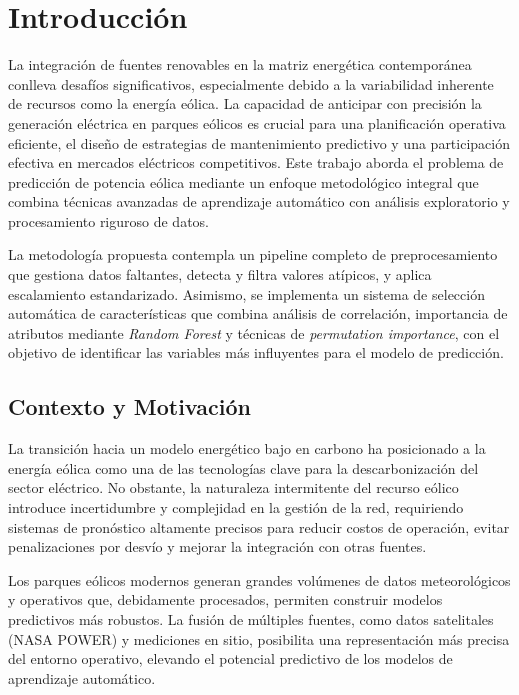 \documentclass[conference]{IEEEtran}
\begin{document}
	
\section{Introducción}
	
La integración de fuentes renovables en la matriz energética contemporánea conlleva desafíos significativos, especialmente debido a la variabilidad inherente de recursos como la energía eólica. La capacidad de anticipar con precisión la generación eléctrica en parques eólicos es crucial para una planificación operativa eficiente, el diseño de estrategias de mantenimiento predictivo y una participación efectiva en mercados eléctricos competitivos. Este trabajo aborda el problema de predicción de potencia eólica mediante un enfoque metodológico integral que combina técnicas avanzadas de aprendizaje automático con análisis exploratorio y procesamiento riguroso de datos.
	
La metodología propuesta contempla un pipeline completo de preprocesamiento que gestiona datos faltantes, detecta y filtra valores atípicos, y aplica escalamiento estandarizado. Asimismo, se implementa un sistema de selección automática de características que combina análisis de correlación, importancia de atributos mediante \textit{Random Forest} y técnicas de \textit{permutation importance}, con el objetivo de identificar las variables más influyentes para el modelo de predicción.
	
\subsection{Contexto y Motivación}
	
La transición hacia un modelo energético bajo en carbono ha posicionado a la energía eólica como una de las tecnologías clave para la descarbonización del sector eléctrico. No obstante, la naturaleza intermitente del recurso eólico introduce incertidumbre y complejidad en la gestión de la red, requiriendo sistemas de pronóstico altamente precisos para reducir costos de operación, evitar penalizaciones por desvío y mejorar la integración con otras fuentes.
	
Los parques eólicos modernos generan grandes volúmenes de datos meteorológicos y operativos que, debidamente procesados, permiten construir modelos predictivos más robustos. La fusión de múltiples fuentes, como datos satelitales (NASA POWER) y mediciones en sitio, posibilita una representación más precisa del entorno operativo, elevando el potencial predictivo de los modelos de aprendizaje automático.
	
\end{document}
